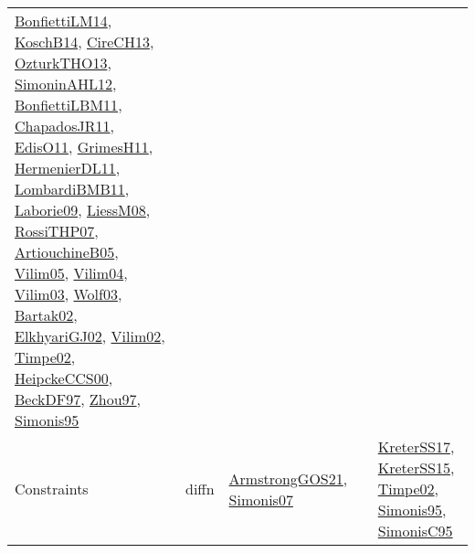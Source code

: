 {\begin{longtable}{llp{6cm}p{6cm}p{6cm}}
\href{papers/BonfiettiLM14.pdf}{BonfiettiLM14}\cite{BonfiettiLM14}, \href{papers/KoschB14.pdf}{KoschB14}\cite{KoschB14}, \href{papers/CireCH13.pdf}{CireCH13}\cite{CireCH13}, \href{articles/OzturkTHO13.pdf}{OzturkTHO13}\cite{OzturkTHO13}, \href{papers/SimoninAHL12.pdf}{SimoninAHL12}\cite{SimoninAHL12}, \href{papers/BonfiettiLBM11.pdf}{BonfiettiLBM11}\cite{BonfiettiLBM11}, \href{papers/ChapadosJR11.pdf}{ChapadosJR11}\cite{ChapadosJR11}, \href{papers/EdisO11.pdf}{EdisO11}\cite{EdisO11}, \href{papers/GrimesH11.pdf}{GrimesH11}\cite{GrimesH11}, \href{papers/HermenierDL11.pdf}{HermenierDL11}\cite{HermenierDL11}, \href{papers/LombardiBMB11.pdf}{LombardiBMB11}\cite{LombardiBMB11}, \href{papers/Laborie09.pdf}{Laborie09}\cite{Laborie09}, \href{articles/LiessM08.pdf}{LiessM08}\cite{LiessM08}, \href{papers/RossiTHP07.pdf}{RossiTHP07}\cite{RossiTHP07}, \href{papers/ArtiouchineB05.pdf}{ArtiouchineB05}\cite{ArtiouchineB05}, \href{papers/Vilim05.pdf}{Vilim05}\cite{Vilim05}, \href{papers/Vilim04.pdf}{Vilim04}\cite{Vilim04}, \href{papers/Vilim03.pdf}{Vilim03}\cite{Vilim03}, \href{papers/Wolf03.pdf}{Wolf03}\cite{Wolf03}, \href{papers/Bartak02.pdf}{Bartak02}\cite{Bartak02}, \href{papers/ElkhyariGJ02.pdf}{ElkhyariGJ02}\cite{ElkhyariGJ02}, \href{papers/Vilim02.pdf}{Vilim02}\cite{Vilim02}, \href{articles/Timpe02.pdf}{Timpe02}\cite{Timpe02}, \href{articles/HeipckeCCS00.pdf}{HeipckeCCS00}\cite{HeipckeCCS00}, \href{papers/BeckDF97.pdf}{BeckDF97}\cite{BeckDF97}, \href{articles/Zhou97.pdf}{Zhou97}\cite{Zhou97}, \href{papers/Simonis95.pdf}{Simonis95}\cite{Simonis95}\\
Constraints & diffn & \href{papers/ArmstrongGOS21.pdf}{ArmstrongGOS21}\cite{ArmstrongGOS21}, \href{articles/Simonis07.pdf}{Simonis07}\cite{Simonis07} &  & \href{articles/KreterSS17.pdf}{KreterSS17}\cite{KreterSS17}, \href{papers/KreterSS15.pdf}{KreterSS15}\cite{KreterSS15}, \href{articles/Timpe02.pdf}{Timpe02}\cite{Timpe02}, \href{papers/Simonis95.pdf}{Simonis95}\cite{Simonis95}, \href{papers/SimonisC95.pdf}{SimonisC95}\cite{SimonisC95}\\

\end{longtable}}
